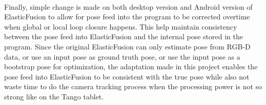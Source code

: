\documentclass[12pt,twoside]{article}
\begin{document}
\\
Finally, simple change is made on both desktop version and Android version of ElasticFusion to allow for pose feed into the program to be corrected overtime when global or local loop closure happens. This help maintain consistency between the pose feed into ElasticFusion and the internal pose stored in the program. Since the original ElasticFusion can only estimate pose from RGB-D data, or use an input pose as ground truth pose, or use the input pose as a bootstrap pose for optimization, the adaptation made in this project enables the pose feed into ElasticFusion to be consistent with the true pose while also not waste time to do the camera tracking process when the processing power is not so strong like on the Tango tablet.


\newpage
\end{document}
